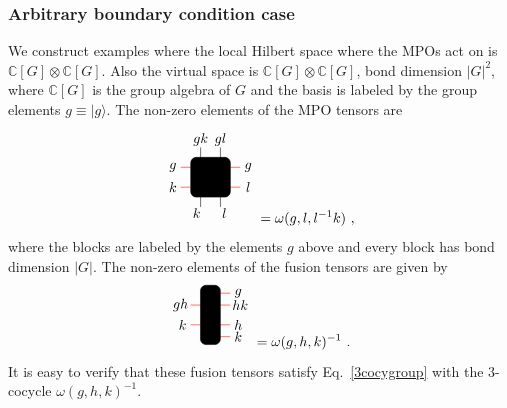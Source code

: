 \documentclass[a4paper,twocolumn,11pt,accepted=2023-02-10]{quantumarticle}
\begin{document}
\subsubsection{Arbitrary boundary condition case}

We construct examples where the local Hilbert space where the MPOs act on is $\mathbb{C}[G]\otimes \mathbb{C}[G]$. Also the virtual space is $\mathbb{C}[G]\otimes \mathbb{C}[G]$, bond dimension $|G|^2$, where $\mathbb{C}[G]$ is the group algebra of $G$ and the basis is labeled by the group elements $g \equiv |g\rangle$. The non-zero elements of the MPO tensors are
$$
\begin{tikzpicture}
\draw[red] (-0.75, 0.25) -- (0.75, 0.25);
\node at (-0.95, 0.25) {$g$};
\node at (0.95, 0.25) {$g$};
\draw[red] (-0.75, -0.25) -- (0.75, -0.25);
\node at (-0.95, -0.25) {$k$};
\node at (0.95, -0.25) {$l$};
\draw (-0.25, 0.75) -- (-0.25, -0.75);
\node at (-0.35, -0.9) {$k$};
\node at (0.35, -0.9) {$l$};
\draw (0.25, 0.75) -- (0.25, -0.75);
\node at (-0.25, 0.95) {$gk$};
\node at (0.25, 0.95) {$gl$};
\draw[rounded corners, fill= black] (-0.5,-0.5) rectangle (0.5,0.5);
\end{tikzpicture}
= \omega(g,l,l^{-1}k) \ , 
$$
where the blocks are labeled by the elements $g$ above and every block has bond dimension $|G|$. The non-zero elements of the fusion tensors are given by 
\begin{equation}\label{ftexam}
\begin{tikzpicture}
\draw[red] (-0.5, 0.25) -- (0, 0.25);
\node at (-0.75, 0.25) {$gh$};
\draw[red] (-0.5, -0.25) -- (0, -0.25);
\node at (-0.7, -0.25) {$k$};
\draw[red] (0.5, 0.55) -- (0, 0.55);
\node at (0.7, 0.55) {$g$};
\draw[red] (0.5, 0.25) -- (0, 0.25);
\node at (0.75, 0.25) {$hk$};
%
\draw[red] (0.5, -0.55) -- (0, -0.55);
\node at (0.7, -0.55) {$k$};
\draw[red] (0.5, -0.25) -- (0, -0.25);
\node at (0.7, -0.25) {$h$};
\draw[rounded corners, fill= black] (-0.25,-0.75) rectangle (0.25,0.75);
\end{tikzpicture}
= \omega(g,h,k)^{-1} \ .
\end{equation}
It is easy to verify that these fusion tensors satisfy Eq.\ \eqref{3cocygroup} with the $3$-cocycle $\omega(g,h,k)^{-1}$.
\end{document}
